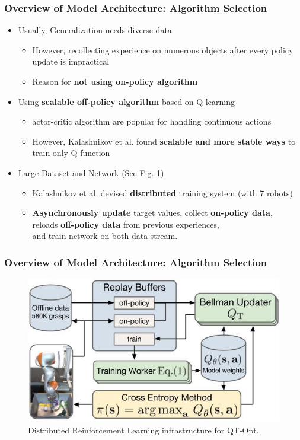 \documentclass{beamer}
\newcommand{\thirdSec}{Overview of Model Architecture}
\begin{document}
    \begin{frame}
      \frametitle{\thirdSec: Algorithm Selection}
      \begin{itemize}
        \item Usually, Generalization needs diverse data
        \begin{itemize}
          \item However, recollecting experience on numerous objects after every policy update is impractical
          \item Reason for \textbf{not using on-policy algorithm}
        \end{itemize}
        \pause
        \item Using \textbf{scalable off-policy algorithm} based on Q-learning
        \begin{itemize}
          \item actor-critic algorithm are popular for handling continuous actions
          \item However, Kalashnikov et al. found \textbf{scalable and more stable ways} to train only Q-function
        \end{itemize}
        \pause
        \item Large Dataset and Network (See Fig. \ref{fig:ModelStructure})
        \begin{itemize}
          \item Kalashnikov et al. devised \textbf{distributed} training system (with 7 robots)
          \item \textbf{Asynchronously update} target values, collect \textbf{on-policy data}, \\
                reloads \textbf{off-policy data} from previous experiences, \\ 
                and train network on both data stream.
        \end{itemize}
      \end{itemize}
    \end{frame}

    \begin{frame}
      \frametitle{\thirdSec : Algorithm Selection}
      \begin{figure}
        \centering
        \includegraphics[]{Images/ModelStructure.jpg}
        \caption{Distributed Reinforcement Learning infrastructure for QT-Opt.}
        \label{fig:ModelStructure}
      \end{figure}
    \end{frame}
\end{document}

